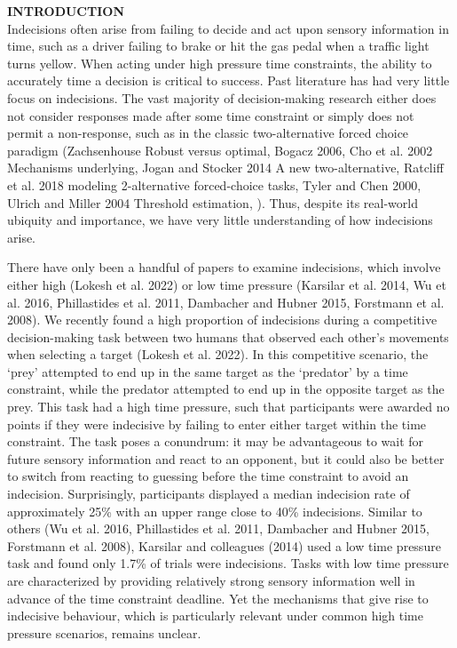 \documentclass[12pt,letterpaper]{article}
\begin{document}
\noindent\textbf{\large\textcolor{mydarkblue}{INTRODUCTION}}
\vspace{2mm}
\\
Indecisions often arise from failing to decide and act upon sensory information in time, such as a driver failing to brake or hit the gas pedal when a traffic light turns yellow. When acting under high pressure time constraints, the ability to accurately time a decision is critical to success. Past literature has had very little focus on indecisions. The vast majority of decision-making research either does not consider responses made after some time constraint or simply does not permit a non-response, such as in the classic two-alternative forced choice paradigm (Zachsenhouse Robust versus optimal,  Bogacz 2006, Cho et al. 2002 Mechanisms underlying, Jogan and Stocker 2014 A new two-alternative, Ratcliff et al. 2018 modeling 2-alternative forced-choice tasks, Tyler and Chen 2000, Ulrich and Miller 2004 Threshold estimation,   ). Thus, despite its real-world ubiquity and importance, we have very little understanding of how indecisions arise.

There have only been a handful of papers to examine indecisions, which involve either high (Lokesh et al. 2022) or low time pressure (Karsilar et al. 2014, Wu et al. 2016, Phillastides et al. 2011, Dambacher and Hubner 2015, Forstmann et al. 2008). We recently found a high proportion of indecisions during a competitive decision-making task between two humans that observed each other’s movements when selecting a target (Lokesh et al. 2022). In this competitive scenario, the ‘prey’ attempted to end up in the same target as the ‘predator’ by a time constraint, while the predator attempted to end up in the opposite target as the prey. This task had a high time pressure, such that participants were awarded no points if they were indecisive by failing to enter either target within the time constraint. The task poses a conundrum: it may be advantageous to wait for future sensory information and react to an opponent, but it could also be better to switch from reacting to guessing before the time constraint to avoid an indecision. Surprisingly, participants displayed a median indecision rate of approximately 25\% with an upper range close to 40\% indecisions. Similar to others (Wu et al. 2016, Phillastides et al. 2011, Dambacher and Hubner 2015, Forstmann et al. 2008), Karsilar and colleagues (2014) used a low time pressure task and found only 1.7\% of trials were indecisions. Tasks with low time pressure are characterized by providing relatively strong sensory information well in advance of the time constraint deadline. Yet the mechanisms that give rise to indecisive behaviour, which is particularly relevant under common high time pressure scenarios, remains unclear. 
\end{document}
